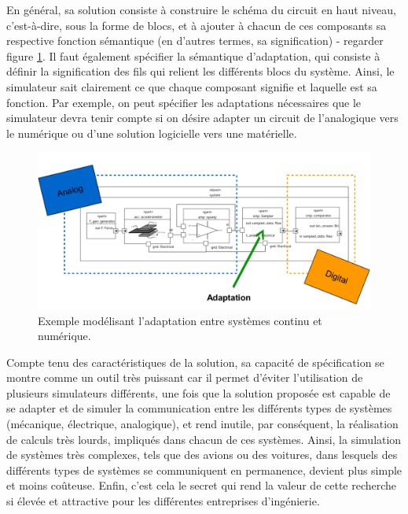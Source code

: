\documentclass{article}
\begin{document}
\vspace{12pt}

En général, sa solution consiste à construire le schéma du circuit en haut
niveau, c'est-à-dire, sous la forme de blocs, et à ajouter à chacun de
ces composants sa respective fonction sémantique (en d'autres termes, sa
signification) - regarder figure \ref{fig:ex1}. Il faut également spécifier la
sémantique d'adaptation, qui consiste à définir la signification des fils qui relient les différents blocs du
système. Ainsi, le simulateur sait clairement ce que chaque composant
signifie et laquelle est sa fonction. Par exemple, on peut spécifier
les adaptations nécessaires que le simulateur devra tenir compte si on désire
adapter un circuit de l'analogique vers le numérique ou d'une solution
logicielle vers une matérielle.

\vspace{12pt}

\begin{figure}[h]
\centering
\includegraphics[scale=0.50]{images/exemple2}
\caption{Exemple modélisant l'adaptation entre systèmes continu et numérique.}
\label{fig:ex1}
\end{figure}

\vspace{12pt}

Compte tenu des caractéristiques de la solution, sa capacité de spécification se
montre comme un outil très puissant car il permet d'éviter l'utilisation de
plusieurs simulateurs différents, une fois que la solution proposée est capable
de se adapter et de simuler la communication entre les différents types de
systèmes (mécanique, électrique, analogique), et rend inutile, par conséquent,
la réalisation de calculs très lourds, impliqués dans chacun de ces systèmes.
Ainsi, la simulation de systèmes très complexes, tels que des avions ou des
voitures, dans lesquels des différents types de systèmes se communiquent en
permanence, devient plus simple et moins coûteuse. Enfin, c'est cela le secret
qui rend la valeur de cette recherche si élevée et attractive pour les
différentes entreprises d'ingénierie.
\end{document}
